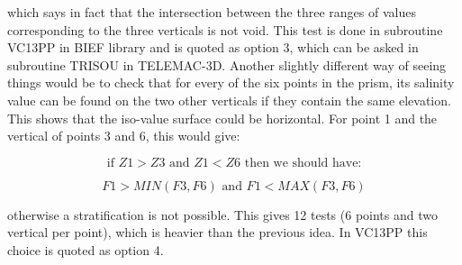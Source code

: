 which says in fact that the intersection between the three ranges of values
corresponding to the three verticals is not void. This test is done in
subroutine VC13PP in BIEF library and is quoted as option 3, which can be
asked in subroutine TRISOU in TELEMAC-3D. Another slightly
different way of seeing things would be to check that for every of the six
points in the prism, its salinity value can be found on the two other
verticals if they contain the same elevation. This shows that the iso-value
surface could be horizontal. For point 1 and the vertical of points 3 and 6,
this would give:%

\begin{equation}
\text{if }Z1>Z3\text{ and }Z1<Z6\text{ then we should have:}%
\end{equation}
%

\begin{equation}
F1>MIN(F3,F6)\text{ and }F1<MAX(F3,F6)
\end{equation}


otherwise a stratification is not possible. This gives 12 tests (6 points and
two vertical per point), which is heavier than the previous idea. In VC13PP
this choice is quoted as option 4.
